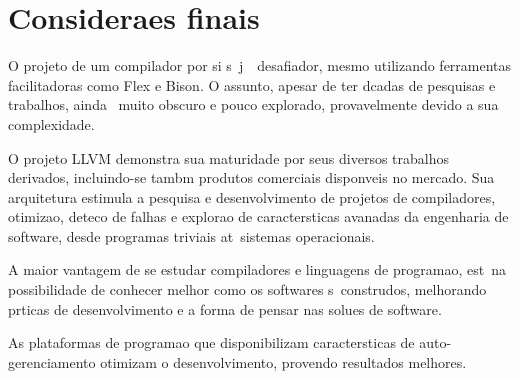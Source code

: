 
\chapter{Considera\co es finais}

O projeto de um compilador por si s\oh\ j\ah\ \eh\ desafiador, mesmo utilizando ferramentas facilitadoras como Flex e Bison. O assunto, apesar de ter d\eh cadas de pesquisas e trabalhos, ainda \eh\ muito obscuro e pouco explorado, provavelmente devido a sua complexidade.

O projeto LLVM demonstra sua maturidade por seus diversos trabalhos derivados, incluindo-se tamb\eh m produtos comerciais dispon\ih veis no mercado. Sua arquitetura estimula a pesquisa e desenvolvimento de projetos de compiladores, otimiza\ca o, detec\ca o de falhas e explora\ca o de caracter\ih sticas avan\cc adas da engenharia de software, desde programas triviais at\eh\ sistemas operacionais.

A maior vantagem de se estudar compiladores e linguagens de programa\ca o, est\ah\ na possibilidade de conhecer melhor como os softwares s\ao\ constru\ih dos, melhorando pr\ah ticas de desenvolvimento e a forma de pensar nas solu\co es de software.

As plataformas de programa\ca o que disponibilizam caracter\ih sticas de auto-gerenciamento otimizam o desenvolvimento, provendo resultados melhores.
